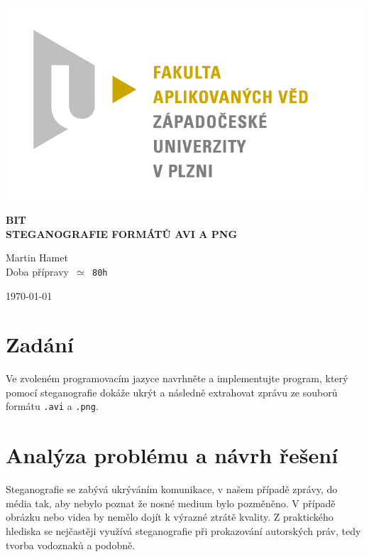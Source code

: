 \documentclass[12pt]{article}
\begin{document}
\begin{titlepage}
\includegraphics[scale=0.2, trim=5cm 0 0 30cm]{logo.jpg}
\begin{center}
\vspace{5cm}
{\Huge
\textbf{BIT}\\
\vspace{1cm}
}
{\Large
\textbf{STEGANOGRAFIE FORMÁTŮ AVI A PNG}
}
\end{center}
\vspace{\fill}

\begin{minipage}[t]{5cm}
\flushleft
Martin Hamet\\
Doba přípravy\texttt{ $\simeq$ 80h}
\end{minipage}
\hfill
\begin{minipage}[t]{7cm}
\flushright
\today
\end{minipage}
\end{titlepage}

\tableofcontents
\newpage
\section{Zadání}
\label{zadani}
Ve zvoleném programovacím jazyce navrhněte a implementujte program, který pomocí steganografie dokáže ukrýt a následně extrahovat zprávu ze souborů formátu \texttt{.avi} a \texttt{.png}.

\section{Analýza problému a návrh řešení}
Steganografie se zabývá ukrýváním komunikace, v našem případě zprávy, do média tak, aby nebylo poznat že nosné medium bylo pozměněno. V případě obrázku nebo videa by nemělo dojít k výrazné ztrátě kvality. Z praktického hlediska se nejčastěji využívá steganografie při prokazování autorských práv, tedy tvorba vodoznaků a podobně.
\end{document}
